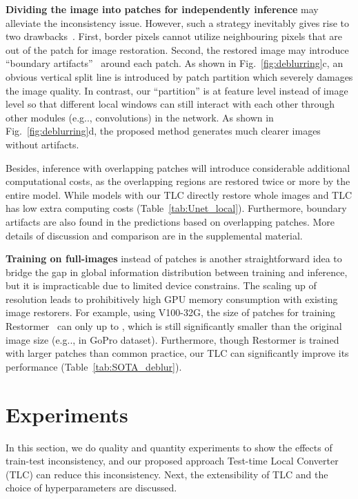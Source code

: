 \documentclass[runningheads]{llncs}
\makeatletter
\DeclareRobustCommand\onedot{\futurelet\@let@token\@onedot}
\def\@onedot{\ifx\@let@token.\else.\null\fi\xspace}
\def\eg{e.g\onedot}
\makeatother
\begin{document}
\textbf{Dividing the image into patches for independently inference}  may alleviate the inconsistency issue. However, such a strategy inevitably gives rise to two drawbacks~\cite{liang2021swinir}. First, border pixels cannot utilize neighbouring pixels that are out of the patch for image restoration. Second, the restored image may introduce ``boundary artifacts''~\cite{lee2015block} around each patch. 
As shown in Fig.~\ref{fig:deblurring}c, an obvious vertical split line is introduced by patch partition which severely damages the image quality. In contrast, our ``partition'' is at feature level instead of image level so that different local windows can still interact with each other through other modules (\eg, convolutions) in the network. As shown in Fig.~\ref{fig:deblurring}d, the proposed method generates much clearer images without artifacts.

Besides, inference with overlapping patches will introduce considerable additional computational costs, as the overlapping regions are restored twice or more by the entire model. While models with our TLC directly restore whole images and TLC has low extra computing costs (Table~\ref{tab:Unet_local}). 
Furthermore, boundary artifacts are also found in the predictions based on overlapping patches. 
More details of discussion and comparison are in the supplemental material. 


\textbf{Training on full-images} instead of patches is another straightforward idea to bridge the gap in global information distribution between training and inference, but it is impracticable due to limited device constrains. The scaling up of resolution leads to prohibitively high GPU memory consumption with existing image restorers.
For example, using V100-32G, the size of patches for training  Restormer~\cite{zamir2021restormer} can only up to ,
which is still significantly smaller than the original image size (\eg,  in GoPro dataset). Furthermore, though Restormer is trained with larger patches than common practice, our TLC can significantly improve its performance (Table~\ref{tab:SOTA_deblur}). \section{Experiments}
In this section, we do quality and quantity experiments to show the effects of train-test inconsistency, and our proposed approach Test-time Local Converter (TLC) can reduce this inconsistency. Next, the extensibility of TLC and the choice of hyperparameters are discussed.
\end{document}
